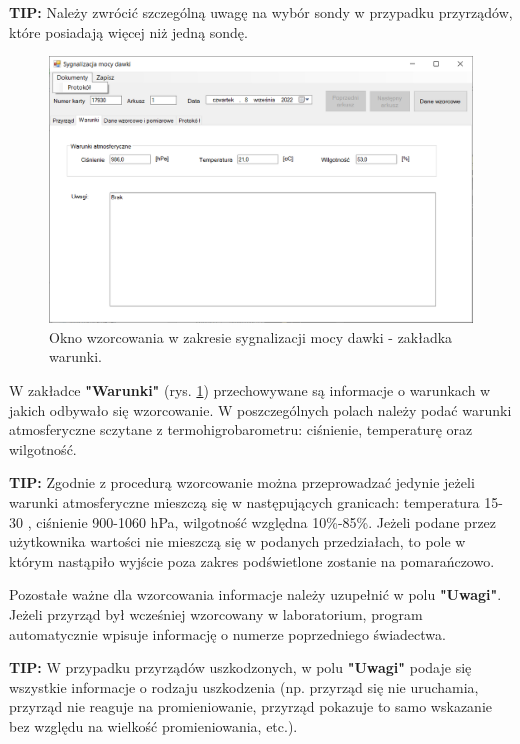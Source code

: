 	\textbf{TIP:} Należy zwrócić szczególną uwagę na wybór sondy w przypadku przyrządów, które posiadają więcej niż jedną sondę.
	
	\begin{figure}[htb]
	\centering
	\includegraphics[width=\columnwidth]{obrazki/Wzorcowanie/syg_mocy_dawki/warunki.png}
	\caption{Okno wzorcowania w zakresie sygnalizacji mocy dawki - zakładka warunki.}
	\label{sygMocyWarunki}
	\end{figure}
	
	W zakładce \textbf{"Warunki"} (rys. \ref{sygMocyWarunki}) przechowywane są informacje o warunkach w jakich odbywało się wzorcowanie. W poszczególnych polach należy podać warunki atmosferyczne sczytane z termohigrobarometru: ciśnienie, temperaturę oraz wilgotność.
	
	\textbf{TIP:} Zgodnie z procedurą wzorcowanie można przeprowadzać jedynie jeżeli warunki atmosferyczne mieszczą się w następujących granicach: temperatura 15-30 \textcelsius, ciśnienie 900-1060 hPa,  wilgotność względna 10\%-85\%. Jeżeli podane przez użytkownika wartości nie mieszczą się w podanych przedziałach, to pole w którym nastąpiło wyjście poza zakres podświetlone zostanie na pomarańczowo.
	
	Pozostałe ważne dla wzorcowania informacje należy uzupełnić w polu \textbf{"Uwagi"}. Jeżeli przyrząd był wcześniej wzorcowany w laboratorium, program automatycznie wpisuje informację o numerze poprzedniego świadectwa. 
	
	\textbf{TIP:} W przypadku przyrządów uszkodzonych, w polu \textbf{"Uwagi"} podaje się wszystkie informacje o rodzaju uszkodzenia (np. przyrząd się nie uruchamia, przyrząd nie reaguje na promieniowanie, przyrząd pokazuje to samo wskazanie bez względu na wielkość promieniowania, etc.).

